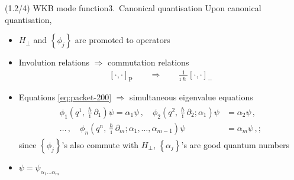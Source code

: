 \documentclass[mathserif]{beamer}
\newcommand{\sbr}[1]{{\left[#1\right]}}
\newcommand{\cbr}[1]{{\left\{#1\right\}}}
\newcommand{\rfun}[2]{#1\mathopen{}\left(#2\right)\mathclose{}}
\newcommand\mi{\mathrm{i}} %
\begin{document}
\begin{frame}{(1.2/4) WKB mode function}{3.\ Canonical quantisation}
Upon canonical quantisation,
\begin{itemize}
    \item $H_\perp$ and $\cbr{\phi_j}$ are promoted to operators
    \item Involution relations $\Rightarrow$ commutation relations
    \begin{align}
        \sbr{\cdot,\cdot}_{\text{P}}
        \qquad\Rightarrow\qquad
        \tfrac{1}{\mi \hslash}\sbr{\cdot,\cdot}_{-}
    \end{align}
    \item
    Equations \eqref{eq:packet-200} $\Rightarrow$ \alert{simultaneous 
    eigenvalue equations}
    \begin{align}
\begin{split}
    \rfun{\phi_1}{q^1, \tfrac{\hslash}{\mi}\partial_1} \psi = \alpha_1 \psi\,,
    \quad
    \rfun{\phi_2}{q^2, \tfrac{\hslash}{\mi}\partial_2; \alpha_1} \psi &= \alpha_2 \psi\,, \\
    \ldots\,,\quad
    \rfun{\phi_n}{q^n, \tfrac{\hslash}{\mi}\partial_m; \alpha_1,\ldots, \alpha_{m-1}}\psi &= \alpha_m \psi\,,;
\end{split}
    \label{eq:packet-300}
    \end{align}
    since $\cbr{\phi_j}$'s also commute with $H_\perp$, $\cbr{\alpha_j}$'s are good quantum numbers
    
    \item
    $\psi = \psi_{\alpha_1 \ldots \alpha_m}$
\end{itemize}
\end{frame}
\end{document}
